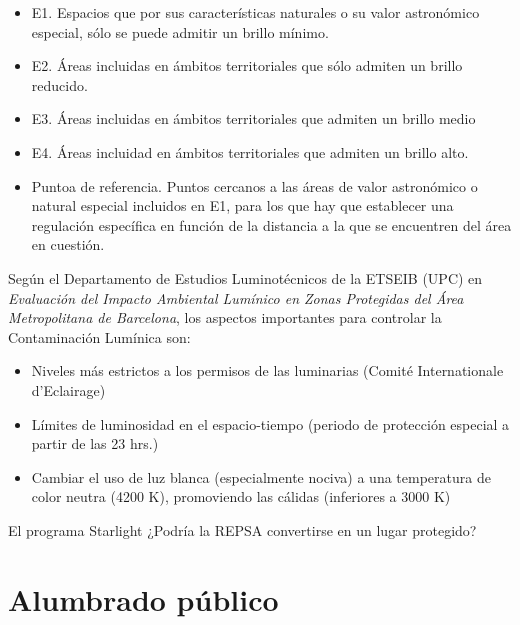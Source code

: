 \begin{itemize}

    \item E1. Espacios que por sus características naturales o su valor astronómico especial, sólo se puede admitir un brillo mínimo.
    
    \item E2. Áreas incluidas en ámbitos territoriales que sólo admiten un brillo reducido.
    
    \item E3. Áreas incluidas en ámbitos territoriales que admiten un brillo medio
    
    \item E4. Áreas incluidad en ámbitos territoriales que admiten un brillo alto.
    
    \item Puntoa de referencia. Puntos cercanos a las áreas de valor astronómico o natural especial incluidos en E1, para los que hay que establecer una regulación específica en función de la distancia a la que se encuentren del área en cuestión.
    
    
\end{itemize}

Según el Departamento de Estudios Luminotécnicos de la ETSEIB (UPC) en \textit{Evaluación del Impacto Ambiental Lumínico en Zonas Protegidas del Área Metropolitana de Barcelona}, los aspectos importantes para controlar la Contaminación Lumínica son:

\begin{itemize}
    \item Niveles más estrictos a los permisos de las luminarias (Comité Internationale d'Eclairage)
    
    \item Límites de luminosidad en el espacio-tiempo (periodo de protección especial a partir de las 23 hrs.)
    
     \item Cambiar el uso de luz blanca (especialmente nociva) a una temperatura de color neutra (4200 K), promoviendo las cálidas (inferiores a 3000 K)
     
\end{itemize}

El programa Starlight ¿Podría la REPSA convertirse en un lugar protegido?   

\section{Alumbrado público}


